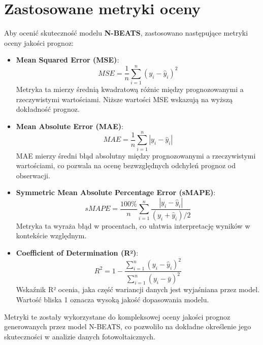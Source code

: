 \documentclass[a4paper,fleqn,final]{cas-dc}\usepackage[authoryear,longnamesfirst]{natbib}
\begin{document}
\section{Zastosowane metryki oceny}
Aby ocenić skuteczność modelu \textbf{N-BEATS}, zastosowano następujące metryki oceny jakości prognoz:
\begin{itemize}
    \item \textbf{Mean Squared Error (MSE)}: 
    \begin{equation}
    MSE = \frac{1}{n} \sum_{i=1}^n (y_i - \hat{y}_i)^2
    \end{equation}
    Metryka ta mierzy średnią kwadratową różnic między prognozowanymi a rzeczywistymi wartościami. Niższe wartości MSE wskazują na wyższą dokładność prognoz.
    
    \item \textbf{Mean Absolute Error (MAE)}:
    \begin{equation}
    MAE = \frac{1}{n} \sum_{i=1}^n |y_i - \hat{y}_i|
    \end{equation}
    MAE mierzy średni błąd absolutny między prognozowanymi a rzeczywistymi wartościami, co pozwala na ocenę bezwzględnych odchyleń prognoz od obserwacji.

    \item \textbf{Symmetric Mean Absolute Percentage Error (sMAPE)}:
    \begin{equation}
    sMAPE = \frac{100\%}{n} \sum_{i=1}^n \frac{|y_i - \hat{y}_i|}{(y_i + \hat{y}_i)/2}
    \end{equation}
    Metryka ta wyraża błąd w procentach, co ułatwia interpretację wyników w kontekście względnym.

    \item \textbf{Coefficient of Determination (R²)}:
    \begin{equation}
    R^2 = 1 - \frac{\sum_{i=1}^n (y_i - \hat{y}_i)^2}{\sum_{i=1}^n (y_i - \bar{y})^2}
    \end{equation}
    Wskaźnik R² ocenia, jaka część wariancji danych jest wyjaśniana przez model. Wartość bliska 1 oznacza wysoką jakość dopasowania modelu.
\end{itemize}

Metryki te zostały wykorzystane do kompleksowej oceny jakości prognoz generowanych przez model N-BEATS, co pozwoliło na dokładne określenie jego skuteczności w analizie danych fotowoltaicznych.


\end{document}
